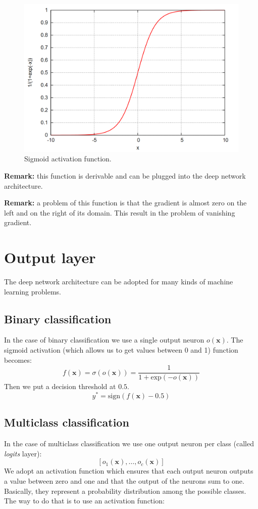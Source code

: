 \begin{figure}
    \centering
    \includegraphics[scale=0.2]{images/sigmoid.png}
    \caption{Sigmoid activation function.}
    \label{fig:sigmoid}
\end{figure}

\textbf{Remark:} this function is derivable and can be plugged into the deep network architecture. \newline

\textbf{Remark:} a problem of this function is that the gradient is almost zero on the left and on the right of its domain. This result in the problem of vanishing gradient. \newline

\section{Output layer}
The deep network architecture can be adopted for many kinds of machine learning problems. \newline

\subsection{Binary classification}
In the case of binary classification we use a single output neuron $o(\pmb{x})$. The sigmoid activation (which allows us to get values between 0 and 1) function becomes:
$$f(\pmb{x}) = \sigma(o(\pmb{x})) = \frac{1}{1+\text{exp}(-o(\pmb{x}))}$$
Then we put a decision threshold at $0.5$.
$$y^* = \text{sign}(f(\pmb{x}) - 0.5)$$

\subsection{Multiclass classification}
In the case of multiclass classification we use one output neuron per class (called \textit{logits} layer):
$$[o_1(\pmb{x}), \hdots, o_c(\pmb{x})]$$
We adopt an activation function which ensures that each output neuron outputs a value between zero and one and that the output of the neurons sum to one. Basically, they represent a probability distribution among the possible classes. The way to do that is to use an activation function:

